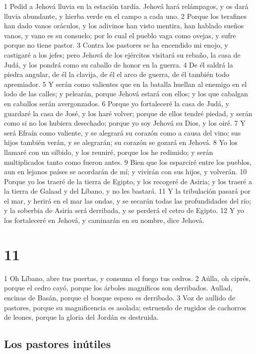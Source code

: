 1 Pedid a Jehová lluvia en la estación tardía. Jehová hará relámpagos, y os dará lluvia abundante, y hierba verde en el campo a cada uno.
2 Porque los terafines han dado vanos oráculos, y los adivinos han visto mentira, han hablado sueños vanos, y vano es su consuelo; por lo cual el pueblo vaga como ovejas, y sufre porque no tiene pastor. 
3 Contra los pastores se ha encendido mi enojo, y castigaré a los jefes; pero Jehová de los ejércitos visitará su rebaño, la casa de Judá, y los pondrá como su caballo de honor en la guerra.
4 De él saldrá la piedra angular, de él la clavija, de él el arco de guerra, de él también todo apremiador.
5 Y serán como valientes que en la batalla huellan al enemigo en el lodo de las calles; y pelearán, porque Jehová estará con ellos; y los que cabalgan en caballos serán avergonzados.
6 Porque yo fortaleceré la casa de Judá, y guardaré la casa de José, y los haré volver; porque de ellos tendré piedad, y serán como si no los hubiera desechado; porque yo soy Jehová su Dios, y los oiré.
7 Y será Efraín como valiente, y se alegrará su corazón como a causa del vino; sus hijos también verán, y se alegrarán; su corazón se gozará en Jehová.
8 Yo los llamaré con un silbido, y los reuniré, porque los he redimido; y serán multiplicados tanto como fueron antes.
9 Bien que los esparciré entre los pueblos, aun en lejanos países se acordarán de mí; y vivirán con sus hijos, y volverán.
10 Porque yo los traeré de la tierra de Egipto, y los recogeré de Asiria; y los traeré a la tierra de Galaad y del Líbano, y no les bastará.
11 Y la tribulación pasará por el mar, y herirá en el mar las ondas, y se secarán todas las profundidades del río; y la soberbia de Asiria será derribada, y se perderá el cetro de Egipto.
12 Y yo los fortaleceré en Jehová, y caminarán en su nombre, dice Jehová.

\chapter{11}

1 Oh Líbano, abre tus puertas, y consuma el fuego tus cedros.
2 Aúlla, oh ciprés, porque el cedro cayó, porque los árboles magníficos son derribados. Aullad, encinas de Basán, porque el bosque espeso es derribado.
3 Voz de aullido de pastores, porque su magnificencia es asolada; estruendo de rugidos de cachorros de leones, porque la gloria del Jordán es destruida.

\section*{Los pastores inútiles}

